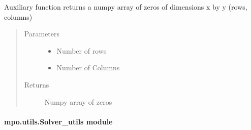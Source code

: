 \documentclass[letterpaper,10pt,english]{sphinxmanual}
\begin{document}
\begin{fulllineitems}
\label{\detokenize{mpo.utils:mpo.utils.mpqp_utils.zeros}}
\sphinxAtStartPar
Auxiliary function returns a numpy array of zeros of dimensions x by y (rows, columns)
\begin{quote}\begin{description}
\item[{Parameters}] \leavevmode\begin{itemize}
\item {} 
\sphinxAtStartPar
{} \textendash{} Number of rows

\item {} 
\sphinxAtStartPar
{} \textendash{} Number of Columns

\end{itemize}

\item[{Returns}] \leavevmode
\sphinxAtStartPar
Numpy array of zeros

\end{description}\end{quote}

\end{fulllineitems}



\paragraph{mpo.utils.Solver\_utils module}
\label{\detokenize{mpo.utils:module-mpo.utils.solver_utils}}\label{\detokenize{mpo.utils:mpo-utils-Solver-utils-module}}
\end{document}
